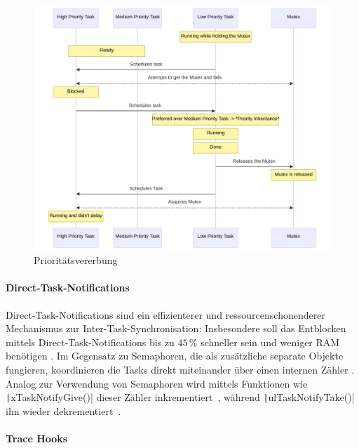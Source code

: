 \begin{figure}[H]
    \centering
    \includegraphics[width=1\textwidth]{assets/prio_inheritance}
    \caption{Prioritätsvererbung}
    \label{fig:sequence_diagramm_inherit}
\end{figure}

\paragraph{Direct-Task-Notifications} \label{sec:direct_task_notification}

Direct-Task-Notifications sind ein effizienterer und ressourcenschonenderer
Mechanismus zur Inter-Task-Synchronisation: Insbesondere soll das Entblocken
mittels Direct-Task-Notifications bis zu $45\,\%$ schneller sein und weniger RAM
benötigen \cite{freertos_task_notifications_usage}. Im Gegensatz zu Semaphoren,
die als zusätzliche separate Objekte fungieren, koordinieren die Tasks direkt
miteinander über einen internen Zähler \cite{freertos_tasks_c_308}. Analog zur
Verwendung von Semaphoren wird mittels Funktionen wie
\texttt|xTaskNotifyGive()| dieser Zähler
inkrementiert~\cite{freertos_tasks_c_4990}, während
\texttt|ulTaskNotifyTake()| ihn wieder
dekrementiert~\cite{freertos_tasks_c_4614}.

\paragraph{Trace Hooks} \label{sec:trace_hooks}

